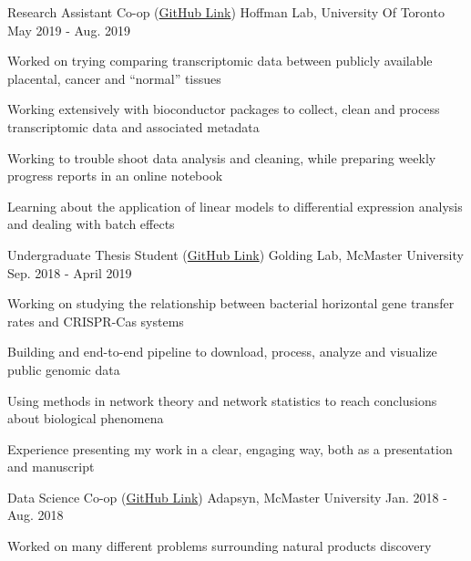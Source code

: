 \begin{cventries}
    \cventry
      {Research Assistant Co-op (\href{https://hoffmanlab.org/}{GitHub Link})}
      {Hoffman Lab, University Of Toronto}
      {May 2019 - Aug. 2019}
      {}
      {
        \begin{cvitems}
         \item {Worked on trying comparing transcriptomic data between publicly available placental, cancer and ``normal'' tissues}
         \item {Working extensively with bioconductor packages to collect, clean and process transcriptomic data and associated metadata}
         \item {Working to trouble shoot data analysis and cleaning, while preparing weekly progress reports in an online notebook}
         \item {Learning about the application of linear models to differential expression analysis and dealing with batch effects}
        \end{cvitems}
      }
    \cventry
      {Undergraduate Thesis Student (\href{https://github.com/DJSiddharthVader/thesis_SidReed}{GitHub Link})}
      {Golding Lab, McMaster University}
      {Sep. 2018 - April 2019}
      {}
      {
        \begin{cvitems}
         \item {Working on studying the relationship between bacterial horizontal gene transfer rates and CRISPR-Cas systems}
         \item {Building and end-to-end pipeline to download, process, analyze and visualize public genomic data}
         \item {Using methods in network theory and network statistics to reach conclusions about biological phenomena}
         \item {Experience presenting my work in a clear, engaging way, both as a presentation and manuscript}
        \end{cvitems}
      }
    \cventry
      {Data Science Co-op (\href{https://github.com/Adapsyn}{GitHub Link})}
      {Adapsyn, McMaster University}
      {Jan. 2018 - Aug. 2018}
      {}
      {
        \begin{cvitems}
         \item {Worked on many different problems surrounding natural products discovery}

\end{cvitems}}
\end{cventries}
